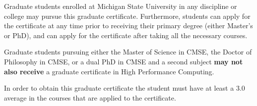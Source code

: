 Graduate students enrolled at Michigan State University in any
discipline or college may pursue this graduate certificate.
Furthermore, students can apply for the certificate at any time prior
to receiving their primary degree (either Master’s or PhD), and can
apply for the certificate after taking all the necessary courses.

Graduate students pursuing either the Master of Science in CMSE, the
Doctor of Philosophy in CMSE, or a dual PhD in CMSE and a second
subject \textbf{may not also receive} a graduate certificate in
High Performance Computing.

In order to obtain this graduate certificate the student must have at
least a 3.0 average in the courses that are applied to the
certificate.

